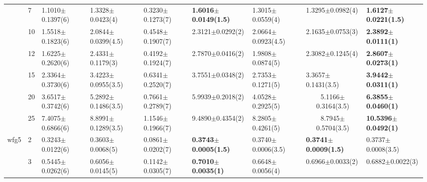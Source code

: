 \begin{table*}[]
\begin{adjustbox}{width=1.0\textwidth,center}
\begin{tabular}{lllllllll}
      & 7                              & 1.1010$\pm$0.1397(6)         & 1.3328$\pm$0.0423(4)          & 0.3230$\pm$0.1273(7)              & \textbf{1.6016$\pm$0.0149(1.5)}                   & 1.3015$\pm$0.0559(4)                     & 1.3295$\pm$0.0982(4)                       & \textbf{1.6127$\pm$0.0221(1.5)} \\
      & 10                             & 1.5518$\pm$0.1823(6)         & 2.0844$\pm$0.0399(4.5)        & 0.4548$\pm$0.1907(7)              & 2.3121$\pm$0.0292(2)                              & 2.0664$\pm$0.0923(4.5)                   & 2.1635$\pm$0.0753(3)                       & \textbf{2.3892$\pm$0.0111(1)}   \\
      & 12                             & 1.6225$\pm$0.2620(6)         & 2.4331$\pm$0.1179(3)          & 0.4192$\pm$0.1924(7)              & 2.7870$\pm$0.0416(2)                              & 1.9808$\pm$0.0874(5)                     & 2.3082$\pm$0.1245(4)                       & \textbf{2.8607$\pm$0.0273(1)}   \\
      & 15                             & 2.3364$\pm$0.3730(6)         & 3.4223$\pm$0.0955(3.5)        & 0.6341$\pm$0.2520(7)              & 3.7551$\pm$0.0348(2)                              & 2.7353$\pm$0.1271(5)                     & 3.3657$\pm$0.1431(3.5)                     & \textbf{3.9442$\pm$0.0311(1)}   \\
      & 20                             & 3.6517$\pm$0.3742(6)         & 5.2892$\pm$0.1486(3.5)        & 0.7661$\pm$0.2789(7)              & 5.9939$\pm$0.2018(2)                              & 4.0528$\pm$0.2925(5)                     & \multicolumn{1}{c}{5.1166$\pm$0.3164(3.5)} & \textbf{6.3855$\pm$0.0460(1)}   \\
      & 25                             & 7.4075$\pm$0.6866(6)         & 8.8991$\pm$0.1289(3.5)        & 1.1546$\pm$0.1966(7)              & 9.4890$\pm$0.4354(2)                              & 8.2805$\pm$0.4261(5)                     & \multicolumn{1}{c}{8.7945$\pm$0.5704(3.5)} & \textbf{10.5396$\pm$0.0492(1)}  \\\thickhline
wfg5  & 2                              & 0.3243$\pm$0.0122(6)         & 0.3603$\pm$0.0068(5)          & 0.0861$\pm$0.0202(7)              & \textbf{0.3743$\pm$0.0005(1.5)}                   & 0.3740$\pm$0.0006(3.5)                   & \textbf{0.3741$\pm$0.0009(1.5)}            & 0.3737$\pm$0.0008(3.5)          \\
      & 3                              & 0.5445$\pm$0.0262(6)         & 0.6056$\pm$0.0145(5)          & 0.1142$\pm$0.0305(7)              & \textbf{0.7010$\pm$0.0035(1)}                     & 0.6648$\pm$0.0056(4)                     & 0.6966$\pm$0.0033(2)                       & 0.6882$\pm$0.0022(3)            \\

\end{tabular}
\end{adjustbox}
\end{table*}
